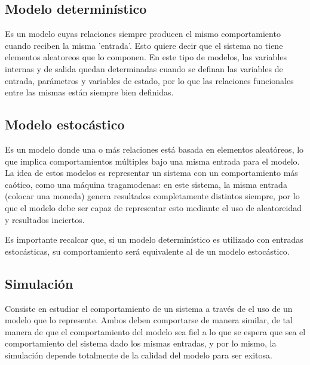 
\subsection{Modelo determinístico}
Es un modelo cuyas relaciones siempre producen el mismo comportamiento cuando reciben la misma 'entrada'. Esto quiere decir que el sistema no tiene elementos aleatoreos que lo componen. En este tipo de modelos, las variables internas y de salida quedan determinadas cuando se definan las variables de entrada, parámetros y variables de estado, por lo que las relaciones funcionales entre las mismas están siempre bien definidas.


\subsection{Modelo estocástico}
Es un modelo donde una o más relaciones está basada en elementos aleatóreos, lo que implica comportamientos múltiples bajo una misma entrada para el modelo. La idea de estos modelos es representar un sistema con un comportamiento más caótico, como una máquina tragamodenas: en este sistema, la misma entrada (colocar una moneda) genera resultados completamente distintos siempre, por lo que el modelo debe ser capaz de representar esto mediante el uso de aleatoreidad y resultados inciertos.

Es importante recalcar que, si un modelo determinístico es utilizado con entradas estocásticas, su comportamiento será equivalente al de un modelo estocástico.


\subsection{Simulación}
Consiste en estudiar el comportamiento de un sistema a través de el uso de un modelo que lo represente. Ambos deben comportarse de manera similar, de tal manera de que el comportamiento del modelo sea fiel a lo que se espera que sea el comportamiento del sistema dado los mismas entradas, y por lo mismo, la simulación depende totalmente de la calidad del modelo para ser exitosa.


